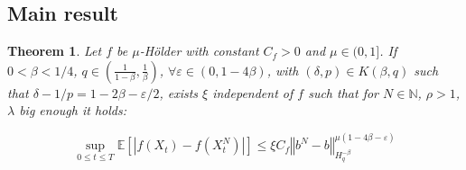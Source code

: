 \documentclass[11pt]{enstaPRE}
\newtheorem{theo}{Theorem}
\newcommand{\norme}[1]{\left\Vert #1\right\Vert}
\newcommand{\N}{\mathbb{N}}
\newcommand{\E}{\mathbb{E}}
\begin{document}
\subsection{Main result}

\begin{theo}\label{main}
    Let $f$ be $\mu$-Hölder with constant $C_f>0$ and $\mu\in(0,1]$. If $0<\beta < 1/4$, $q\in\left(\frac{1}{1-\beta},\frac{1}{\beta}\right)$, $\forall \varepsilon \in(0,1-4\beta)$, with  $(\delta,p)\in K(\beta,q)$ such that $\delta - 1/p = 1-2\beta - \varepsilon/2$, exists $\xi$ independent of $f$ such that for $N\in\N$, $\rho>1$, $\lambda$ big enough it holds:
    
    \begin{equation}
    \underset{0\leq t\leq T} {\sup}\E\left[\left|f\left(X_t\right)-f\left(X_t^N\right)\right|\right] \leq \xi C_f \norme{b^N-b}_{H^{-\beta}_{q}}^{\mu\left(1-4\beta-\varepsilon\right)}
    \end{equation}
\end{theo}
\end{document}
